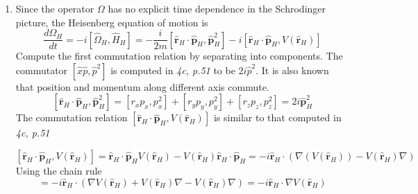 \begin{sol}
\begin{enumerate}[label=\textbf{(\alph*)}]
\item
Since the operator $\Omega$ has no explicit time dependence in the Schrodinger picture, the Heisenberg equation of motion is
$$\frac{d\Omega_H}{dt}=-i[\hat\Omega_H,\hat H_H]=-\frac{i}{2m}[\hat{\mathbf r}_H\cdot \hat{\mathbf p}_H,\hat{\mathbf p}_H^2]-i[\hat{\mathbf r}_H\cdot \hat{\mathbf p}_H,V(\hat {\mathbf{r}}_H)]$$  
Compute the first commutation relation by separating into components. The commutator $[\hat x\hat p,\hat p^2]$ is computed in \textit{4c, p.51} to be $2i\hat p^2$. It is also known that position and momentum along different axis commute.
$$[\hat{\mathbf r}_H\cdot \hat{\mathbf p}_H,\hat{\mathbf p}_H^2]=[r_xp_x,p_x^2]+[r_yp_y,p_y^2]+[r_zp_z,p_z^2]=2i\hat{\mathbf p}_H^2$$
The commutation relation $[\hat{\mathbf r}_H\cdot \hat{\mathbf p}_H,V(\hat {\mathbf{r}}_H)]$ is similar to that computed in \textit{4c, p.51}

$$[\hat{\mathbf r}_H\cdot \hat{\mathbf p}_H,V(\hat {\mathbf{r}}_H)]=\hat{\mathbf r}_H\cdot \hat{\mathbf p}_HV(\hat {\mathbf{r}}_H)-V(\hat {\mathbf{r}}_H)\hat{\mathbf r}_H\cdot \hat{\mathbf p}_H=-i\hat{ \mathbf r}_H\cdot(\nabla( V(\hat {\mathbf{r}}_H))-V(\hat {\mathbf{r}}_H)\nabla)$$ 
Using the chain rule
$$=-i\hat{ \mathbf r}_H\cdot(\nabla V(\hat {\mathbf{r}}_H)+V(\hat {\mathbf{r}}_H)\nabla-V(\hat {\mathbf{r}}_H)\nabla)=-i\hat{ \mathbf r}_H\cdot\nabla V(\hat {\mathbf{r}}_H)$$


\end{enumerate}
\end{sol}
